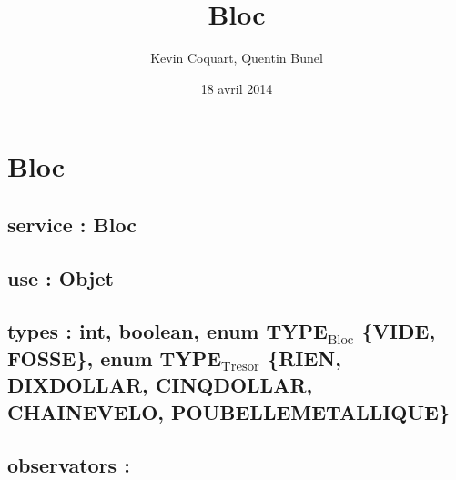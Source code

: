 \documentclass[11pt]{article}
\title{Bloc}
\author{Kevin Coquart, Quentin Bunel}
\date{18 avril 2014}
\begin{document}
\maketitle

\setcounter{tocdepth}{3}
\tableofcontents
\vspace*{1cm}
\section{Bloc}
\label{sec-1}

\subsection{service : Bloc}
\label{sec-1.1}

\subsection{use : Objet}
\label{sec-1.2}

\subsection{types : int, boolean, enum TYPE$_{\mathrm{Bloc}}$ \{VIDE, FOSSE\}, enum TYPE$_{\mathrm{Tresor}}$ \{RIEN, DIXDOLLAR, CINQDOLLAR, CHAINEVELO, POUBELLEMETALLIQUE\}}
\label{sec-1.3}


\subsection{observators :}
\label{sec-1.4}

\subsubsection{}
\end{document}
